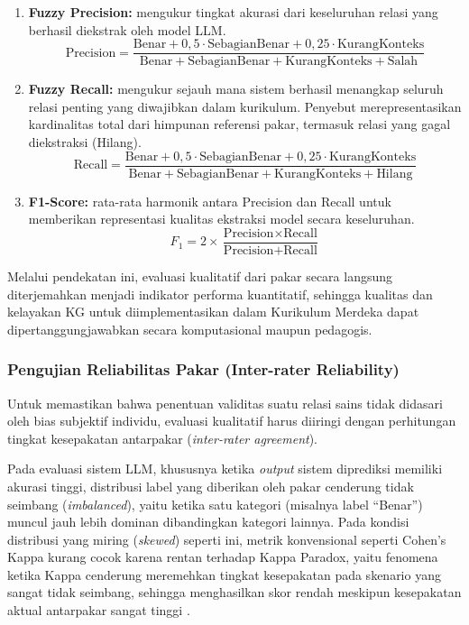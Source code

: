 \documentclass[main]{subfiles}
\begin{document}
\begin{enumerate}
  \item \textbf{Fuzzy Precision:} mengukur tingkat akurasi dari
        keseluruhan relasi yang berhasil diekstrak oleh model LLM.
        \[
          \text{Precision} =
          \frac{\text{Benar}
                + 0{,}5 \cdot \text{SebagianBenar}
                + 0{,}25 \cdot \text{KurangKonteks}}
               {\text{Benar}
                + \text{SebagianBenar}
                + \text{KurangKonteks}
                + \text{Salah}}
        \]

  \item \textbf{Fuzzy Recall:} mengukur sejauh mana sistem berhasil
        menangkap seluruh relasi penting yang diwajibkan dalam kurikulum.
        Penyebut merepresentasikan kardinalitas total dari
        himpunan referensi pakar, termasuk relasi yang gagal diekstraksi
        (Hilang).
        \[
          \text{Recall} =
          \frac{\text{Benar}
                + 0{,}5 \cdot \text{SebagianBenar}
                + 0{,}25 \cdot \text{KurangKonteks}}
               {\text{Benar}
                + \text{SebagianBenar}
                + \text{KurangKonteks}
                + \text{Hilang}}
        \]

  \item \textbf{F1-Score:} rata-rata harmonik antara Precision dan Recall
        untuk memberikan representasi kualitas ekstraksi model secara
        keseluruhan.
        \[
          F_1 = 2 \times
          \frac{\text{Precision} \times \text{Recall}}
               {\text{Precision} + \text{Recall}}
        \]
\end{enumerate}

Melalui pendekatan ini, evaluasi kualitatif dari pakar secara langsung
diterjemahkan menjadi indikator performa kuantitatif, sehingga kualitas
dan kelayakan KG untuk diimplementasikan dalam Kurikulum Merdeka dapat
dipertanggungjawabkan secara komputasional maupun pedagogis.

\subsubsection{Pengujian Reliabilitas Pakar (Inter-rater Reliability)}

Untuk memastikan bahwa penentuan validitas suatu relasi sains tidak
didasari oleh bias subjektif individu, evaluasi kualitatif harus
diiringi dengan perhitungan tingkat kesepakatan antarpakar
(\textit{inter-rater agreement}).

Pada evaluasi sistem LLM, khususnya ketika \textit{output} sistem
diprediksi memiliki akurasi tinggi, distribusi label yang diberikan oleh
pakar cenderung tidak seimbang (\textit{imbalanced}), yaitu ketika satu
kategori (misalnya label ``Benar'') muncul jauh lebih dominan
dibandingkan kategori lainnya. Pada kondisi distribusi yang miring
(\textit{skewed}) seperti ini, metrik konvensional seperti Cohen's Kappa
kurang cocok karena rentan terhadap Kappa Paradox, yaitu fenomena ketika Kappa
cenderung meremehkan tingkat kesepakatan pada skenario yang sangat tidak
seimbang, sehingga menghasilkan skor rendah meskipun kesepakatan aktual
antarpakar sangat tinggi \parencite{gwet_handbook_2014, james_counting_2026}.
\end{document}
